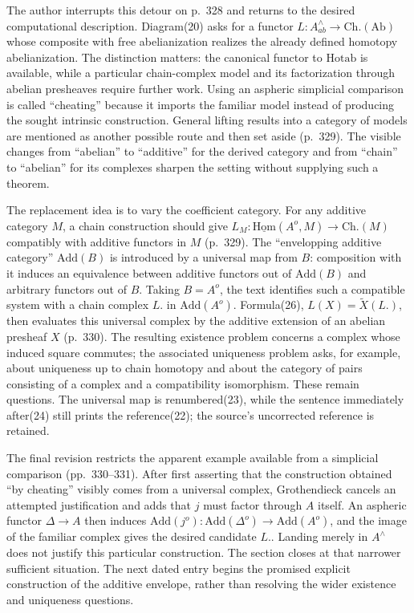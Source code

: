 The author interrupts this detour on p.~328 and returns to the desired computational description. Diagram(20) asks for a functor $L:A^{\wedge}_{ab}\to\mathrm{Ch.}(\mathrm{Ab})$ whose composite with free abelianization realizes the already defined homotopy abelianization. The distinction matters: the canonical functor to $\mathrm{Hotab}$ is available, while a particular chain-complex model and its factorization through abelian presheaves require further work. Using an aspheric simplicial comparison is called ``cheating'' because it imports the familiar model instead of producing the sought intrinsic construction. General lifting results into a category of models are mentioned as another possible route and then set aside (p.~329). The visible changes from ``abelian'' to ``additive'' for the derived category and from ``chain'' to ``abelian'' for its complexes sharpen the setting without supplying such a theorem.

The replacement idea is to vary the coefficient category. For any additive category $M$, a chain construction should give $L_M:\underline{\mathrm{Hom}}(A^o,M)\to\mathrm{Ch.}(M)$ compatibly with additive functors in $M$ (p.~329). The ``envelopping additive category'' $\mathrm{Add}(B)$ is introduced by a universal map from $B$: composition with it induces an equivalence between additive functors out of $\mathrm{Add}(B)$ and arbitrary functors out of $B$. Taking $B=A^o$, the text identifies such a compatible system with a chain complex $L.$ in $\mathrm{Add}(A^o)$. Formula(26), $L(X)=\widetilde X(L.)$, then evaluates this universal complex by the additive extension of an abelian presheaf $X$ (p.~330). The resulting existence problem concerns a complex whose induced square commutes; the associated uniqueness problem asks, for example, about uniqueness up to chain homotopy and about the category of pairs consisting of a complex and a compatibility isomorphism. These remain questions. The universal map is renumbered(23), while the sentence immediately after(24) still prints the reference(22); the source's uncorrected reference is retained.

The final revision restricts the apparent example available from a simplicial comparison (pp.~330--331). After first asserting that the construction obtained ``by cheating'' visibly comes from a universal complex, Grothendieck cancels an attempted justification and adds that $j$ must factor through $A$ itself. An aspheric functor $\Delta\to A$ then induces $\mathrm{Add}(j^o):\mathrm{Add}(\Delta^o)\to\mathrm{Add}(A^o)$, and the image of the familiar complex gives the desired candidate $L.$. Landing merely in $A^{\wedge}$ does not justify this particular construction. The section closes at that narrower sufficient situation. The next dated entry begins the promised explicit construction of the additive envelope, rather than resolving the wider existence and uniqueness questions.

